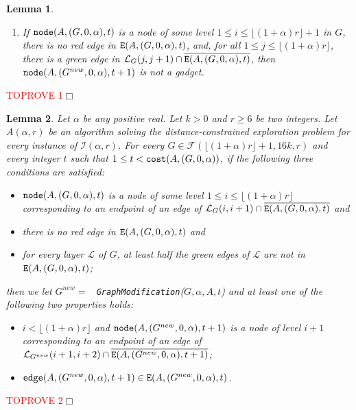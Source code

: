 \documentclass[11pt]{article}
\newtheorem{lemma}{Lemma}[section]
\newcommand{\qed}{\hfill $\Box$ \bigbreak}
\newenvironment{proof}{\noindent {\bf Proof.}}{\qed}
\begin{document}
{\begin{lemma}
\begin{enumerate}
\item If ${\tt node}(A,(G,0,\alpha),t)$ is a node of some level
  $1\leq i\leq\lfloor(1+\alpha)r\rfloor+1$ in $G$, there is no red edge in ${\tt E}(A,(G,0,\alpha),t)$, and, for all $1\leq j \leq
  \lfloor(1+\alpha)r\rfloor$, there is a green edge in
  $\mathcal{L}_{G}(j,j+1)\cap\overline{{\tt E}(A,(G,0,\alpha),t)}$,
  then ${\tt node}(A,(G^{new},0,\alpha),t+1)$ is not a gadget.
\end{enumerate}
\end{lemma}

\begin{proof}\textcolor{red}{TOPROVE 1}\end{proof}

\begin{lemma}
\label{lem:adv2}
Let $\alpha$ be any positive real. Let $k>0$ and $r\geq 6$ be two integers.
Let $A(\alpha,r)$ be an algorithm solving the distance-constrained exploration problem for every instance of $\mathcal{I}(\alpha,r)$.
For every $G\in\mathcal{F}(\lfloor(1+\alpha)r\rfloor+1,16k,r)$ and every integer $t$ such that $1\leq t < {\tt cost}(A,(G,0,\alpha))$, if the following three conditions are satisfied: 
\begin{itemize}
\item ${\tt node}(A,(G,0,\alpha),t)$ is a node of some level $1\leq i\leq\lfloor(1+\alpha)r\rfloor$ corresponding to an endpoint of an edge of $\mathcal{L}_{G}(i,i+1)\cap\overline{{\tt E}(A,(G,0,\alpha),t)}$ and
\item there is no red edge in ${\tt E}(A,(G,0,\alpha),t)$ and
\item for every layer $\mathcal{L}$ of $G$, at least half the green edges of $\mathcal{L}$ are not in ${\tt E}(A,(G,0,\alpha),t)$;
\end{itemize} 
then we let $G^{new}=$ {\tt
  GraphModification}($G,\alpha,A,t$) and at least one of the
following two properties holds:
\begin{itemize}
\item $i<\lfloor(1+\alpha)r\rfloor$ and ${\tt node}(A,(G^{new},0,\alpha),t+1)$ is a node of level $i+1$ corresponding to an endpoint of an edge of $\mathcal{L}_{G^{new}}(i+1,i+2)\cap\overline{{\tt E}(A,(G^{new},0,\alpha),t+1)}$;
\item ${\tt edge}(A,(G^{new},0,\alpha),t+1)\in{\tt E}(A,(G^{new},0,\alpha),t)$.
\end{itemize}
\end{lemma}

\begin{proof}\textcolor{red}{TOPROVE 2}\end{proof}

}
\end{document}
